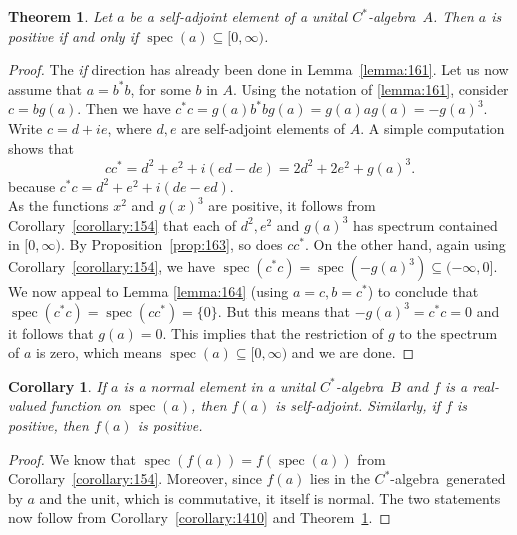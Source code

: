 \documentclass{book}
\newtheorem{theorem}[definition]{Theorem}
\newtheorem{corollary}[definition]{Corollary}
\def\cstar{\(C^*\)-algebra}
\begin{document}
\begin{theorem}\label{theorem:165}
  Let \(a\) be a self-adjoint element of a unital \cstar\ \(A\).
  Then \(a\) is positive if and only if \(\operatorname{spec}(a) \subseteq [0,\infty)\).
\end{theorem}
\begin{proof}
  The \textit{if} direction has already been done in Lemma~\ref{lemma:161}. Let us now
  assume that \(a = b^*b\), for some \(b\) in \(A\). Using the notation of \ref{lemma:161}, consider
  \(c = bg(a)\). Then we have \(c^*c = g(a)b^*bg(a) = g(a)ag(a) = -{g(a)}^3\). Write
  \(c = d+ie\), where \(d,e\) are self-adjoint elements of \(A\). A simple computation
  shows that
  \[
    cc^* = d^2 +e^2 +i(ed - de) = 2d^2 +2e^2 +{g(a)}^3.
  \]
  because \(c^*c=d^2+e^2+i(de-ed)\).\\
  As the functions \(x^2\) and \({g(x)}^3\) are positive, it follows from Corollary~\ref{corollary:154}
  that each of \(d^2,e^2\) and \({g(a)}^3\) has spectrum contained in \([0,\infty)\). By Proposition~\ref{prop:163}, 
  so does \(cc^*\). On the other hand, again using Corollary~\ref{corollary:154}, we have
  \(\operatorname{spec}(c^*c) = \operatorname{spec}(-{g(a)}^3) \subseteq (-\infty,0]\).
  We now appeal to Lemma \ref{lemma:164} (using \(a = c,b = c^*\)) to conclude that
  \(\operatorname{spec}(c^*c) = \operatorname{spec}(cc^*) = \{0\}\). But this means that \(-{g(a)}^3 = c^*c = 0\) and it
  follows that \(g(a) = 0\). This implies that the restriction of \(g\) to the spectrum
  of \(a\) is zero, which means \(\operatorname{spec}(a) \subseteq [0,\infty)\) and we are done.
\end{proof}
\begin{corollary}
  If \(a\) is a normal element in a unital \cstar\ \(B\) and \(f\)
  is a real-valued function on \(\operatorname{spec}(a)\), then \(f(a)\) is self-adjoint. Similarly, if \(f\)
  is positive, then \(f(a)\) is positive.
\end{corollary}
\begin{proof}
  We know that \(\operatorname{spec}(f(a)) = f(\operatorname{spec}(a))\) from Corollary~\ref{corollary:154}. Moreover,
  since \(f(a)\) lies in the \cstar\ generated by \(a\) and the unit, which
  is commutative, it itself is normal. The two statements now follow from Corollary~\ref{corollary:1410}
  and Theorem~\ref{theorem:165}.
\end{proof}
\end{document}
